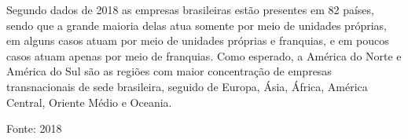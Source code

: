 Segundo dados de 2018 as empresas brasileiras estão presentes em 82
países, sendo que a grande maioria delas atua somente por meio de
unidades próprias, em alguns casos atuam por meio de unidades próprias e
franquias, e em poucos casos atuam apenas por meio de franquias. Como
esperado, a América do Norte e América do Sul são as regiões com maior
concentração de empresas transnacionais de sede brasileira, seguido de
Europa, Ásia, África, América Central, Oriente Médio e Oceania.



{\footnotesize{Fonte:  2018}}

\bigskip

